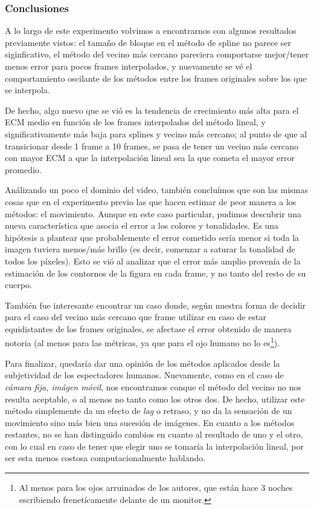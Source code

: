 \subsubsection{Conclusiones}
\par A lo largo de este experimento volvimos a encontrarnos con algunos
resultados previamente vistos: el tama\~no de bloque en el m\'etodo de spline
no parece ser siginficativo, el m\'etodo del vecino m\'as cercano pareciera
comportarse mejor/tener menos error para pocos frames interpolados, y nuevamente
se v\'e el comportamiento oscilante de los m\'etodos entre los frames originales
sobre los que se interpola.

\par De hecho, algo nuevo que se vi\'o es la tendencia de crecimiento m\'as
alta para el ECM medio en funci\'on de los frames interpolados del m\'etodo
lineal, y significativamente m\'as baja para splines y vecino m\'as cercano; al
punto de que al transicionar desde 1 frame a 10 frames, se pasa de tener un
vecino m\'as cercano con mayor ECM a que la interpolaci\'on lineal sea la que
cometa el mayor error promedio.

\par An\'alizando un poco el dominio del video, tambi\'en conclu\'imos que son
las mismas cosas que en el experimento previo las que hacen estimar de peor
manera a los m\'etodos: el movimiento. Aunque en este caso particular, pudimos
descubrir una nueva caracter\'istica que asocia el error a los colores y
tonalidades.  Es una hip\'otesis a plantear que probablemente el error cometido
ser\'ia menor si toda la imagen tuviera menos/m\'as brillo (es decir, comenzar
a saturar la tonalidad de todos los p\'ixeles). Esto se vi\'o al analizar que
el error m\'as amplio proven\'ia de la estimaci\'on de los contornos de la
figura en cada frame, y no tanto del resto de su cuerpo.

\par Tambi\'en fue interesante encontrar un caso donde, seg\'un nuestra forma
de decidir para el caso del vecino m\'as cercano que frame utilizar en caso de
estar equidistantes de los frames originales, se afectase el error obtenido de
manera notoria (al menos para las m\'etricas, ya que para el ojo humano no lo
es\footnote{Al menos para los ojos arruinados de los autores, que est\'an hace
3 noches escribiendo frenet\'icamente delante de un monitor.}).

\par Para finalizar, quedar\'ia dar una opini\'on de los m\'etodos aplicados
desde la subjetividad de los espectadores humanos. Nuevamente, como en el
caso de \emph{c\'amara fija, im\'agen m\'ovil}, nos encontramos conque el
m\'etodo del vecino no nos resulta aceptable, o al menos no tanto como los otros
dos. De hecho, utilizar este m\'etodo simplemente da un efecto de \emph{lag} o
retraso, y no da la sensaci\'on de un movimiento sino m\'as bien una sucesi\'on
de im\'agenes. En cuanto a los m\'etodos restantes, no se han distinguido cambios
en cuanto al resultado de uno y el otro, con lo cual en caso de tener que elegir
uno se tomar\'ia la interpolaci\'on lineal, por ser esta menos costosa
computacionalmente hablando.
